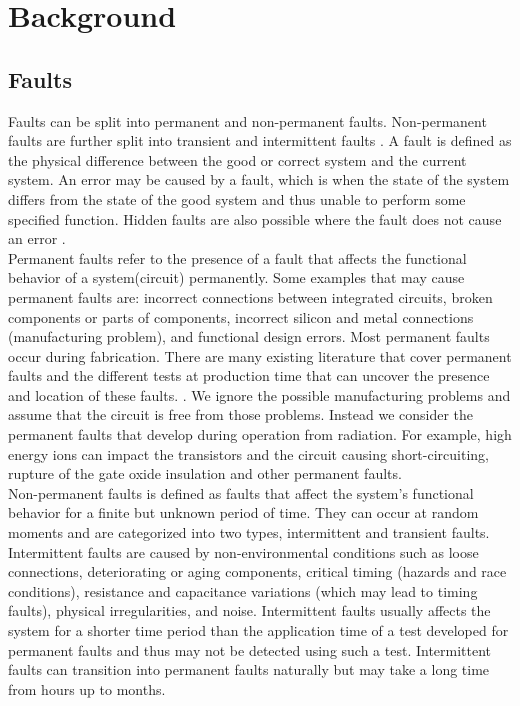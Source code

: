 \documentclass[12pt]{report}
\begin{document}
\chapter{Background}
\section{Faults}
Faults can be split into permanent and non-permanent faults.  Non-permanent faults are further split into transient and intermittent faults \cite{jha_gupta_2003}. %
A fault is defined as the physical difference between the good or correct system and the current system.  An error may be caused by a fault, which is when the state of the system differs from the state of the good system and thus unable to perform some specified function.  Hidden faults are also possible where the fault does not cause an error \cite{jha_gupta_2003}. \\

Permanent faults refer to the presence of a fault that affects the functional behavior of a system(circuit) permanently.  Some examples that may cause permanent faults are: incorrect connections between integrated circuits, broken components or parts of components, incorrect silicon and metal connections (manufacturing problem), and functional design errors.  Most permanent faults occur during fabrication.  There are many existing literature that cover permanent faults and the different tests at production time that can uncover the presence and location of these faults. \cite{jha_gupta_2003} \cite{giz_book_2006}.  We ignore the possible manufacturing problems and assume that the circuit is free from those problems.  Instead we consider the permanent faults that develop during operation from radiation.  For example, high energy ions can impact the transistors and the circuit causing short-circuiting, rupture of the gate oxide insulation and other permanent faults.\\ %

Non-permanent faults is defined as faults that affect the system's functional behavior for a finite but unknown period of time.  They can occur at random moments and are categorized into two types, intermittent and transient faults.  Intermittent faults are caused by non-environmental conditions such as loose connections, deteriorating or aging components, critical timing (hazards and race conditions), resistance and capacitance variations (which may lead to timing faults), physical irregularities, and noise.  Intermittent faults usually affects the system for a shorter time period than the application time of a test developed for permanent faults and thus may not be detected using such a test.  Intermittent faults can transition into permanent faults naturally but may take a long time from hours up to months.  \\
\end{document}
